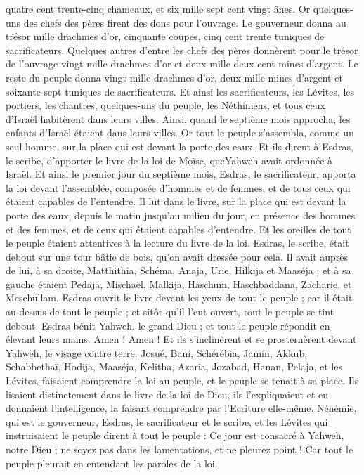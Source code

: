\begin{multicols}{2}
quatre cent trente-cinq chameaux, et six mille sept cent vingt ânes.
Or quelques-uns des chefs des pères firent des dons pour l'ouvrage. Le gouverneur donna au trésor mille drachmes d'or, cinquante coupes, cinq cent trente tuniques de sacrificateurs.
Quelques autres d'entre les chefs des pères donnèrent pour le trésor de l'ouvrage vingt mille drachmes d'or et deux mille deux cent mines d'argent.
Le reste du peuple donna vingt mille drachmes d'or, deux mille mines d'argent et soixante-sept tuniques de sacrificateurs.
Et ainsi les sacrificateurs, les Lévites, les portiers, les chantres, quelques-uns du peuple, les Néthiniens, et tous ceux d'Israël habitèrent dans leurs villes. Ainsi, quand le septième mois approcha, les enfants d'Israël étaient dans leurs villes.
\VerseOne{}Or tout le peuple s'assembla, comme un seul homme, sur la place qui est devant la porte des eaux. Et ils dirent à Esdras, le scribe, d’apporter le livre de la loi de Moïse, queYahweh avait ordonnée à Israël.
Et ainsi le premier jour du septième mois, Esdras, le sacrificateur, apporta la loi devant l'assemblée, composée d'hommes et de femmes, et de tous ceux qui étaient capables de l’entendre.
Il lut dans le livre, sur la place qui est devant la porte des eaux, depuis le matin jusqu'au milieu du jour, en présence des hommes et des femmes, et de ceux qui étaient capables d'entendre. Et les oreilles de tout le peuple étaient attentives à la lecture du livre de la loi.
Esdras, le scribe, était debout sur une tour bâtie de bois, qu'on avait dressée pour cela. Il avait auprès de lui, à sa droite, Matthithia, Schéma, Anaja, Urie, Hilkija et Maaséja ; et à sa gauche étaient Pedaja, Mischaël, Malkija, Haschum, Haschbaddana, Zacharie, et Meschullam.
Esdras ouvrit le livre devant les yeux de tout le peuple ; car il était au-dessus de tout le peuple ; et sitôt qu'il l'eut ouvert, tout le peuple se tint debout.
Esdras bénit Yahweh, le grand Dieu ; et tout le peuple répondit en élevant leurs mains: Amen ! Amen ! Et ils s'inclinèrent et se prosternèrent devant Yahweh, le visage contre terre.
Josué, Bani, Schérébia, Jamin, Akkub, Schabbethaï, Hodija, Maaséja, Kelitha, Azaria, Jozabad, Hanan, Pelaja, et les Lévites, faisaient comprendre la loi au peuple, et le peuple se tenait à sa place.
Ils lisaient distinctement dans le livre de la loi de Dieu, ils l'expliquaient et en donnaient l'intelligence, la faisant comprendre par l'Ecriture elle-même.
Néhémie, qui est le gouverneur, Esdras, le sacrificateur et le scribe, et les Lévites qui instruisaient le peuple dirent à tout le peuple : Ce jour est consacré à Yahweh, notre Dieu ; ne soyez pas dans les lamentations, et ne pleurez point ! Car tout le peuple pleurait en entendant les paroles de la loi.

\end{multicols}
